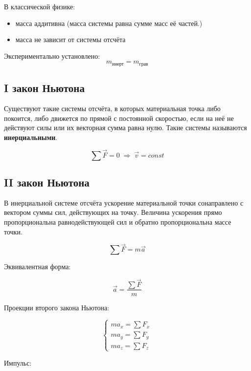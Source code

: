 \documentclass[a4paper,12pt]{article}
\begin{document}
В классической физике:
\begin{itemize}
\item масса аддитивна (масса системы равна сумме масс её частей.)
\item масса не зависит от системы отсчёта
\end{itemize}

Экспериментально установлено:
\[
m_{\text{инерт}} = m_{\text{грав}}
\]

\vspace{0.8em}

\subsection*{I закон Ньютона}

\begin{theorembox}
Существуют такие системы отсчёта, в которых материальная точка либо покоится, либо движется по прямой с постоянной скоростью, если на неё не действуют силы или их векторная сумма равна нулю. Такие системы называются \textbf{инерциальными}.
\end{theorembox}

\[
\sum \vec F = 0
\;\Rightarrow\;
\vec v = const
\]
 

\vspace{0.8em}

\subsection*{II закон Ньютона}

\begin{theorembox}
В инерциальной системе отсчёта ускорение материальной точки сонаправлено с вектором суммы сил, действующих на точку. Величина ускорения прямо пропорциональна равнодействующей сил и обратно пропорциональна массе точки.
\end{theorembox}

\[
\sum \vec F = m \vec a
\]

Эквивалентная форма:

\[
\vec a = \frac{\sum \vec F}{m}
\]

Проекции второго закона Ньютона:

\[
\begin{cases}
m a_x = \sum F_x \\
m a_y = \sum F_y \\
m a_z = \sum F_z
\end{cases}
\]

Импульс:
\end{document}
